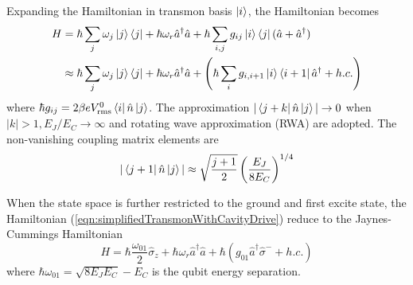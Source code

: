 \documentclass[%
groupedaddress,
showpacs,
 amsmath,amssymb,
 aps,
prb,
]{revtex4-1}
\begin{document}
            Expanding the Hamiltonian in transmon basis $ \ket{i} $, the Hamiltonian becomes
            \begin{align}
            \label{eqn:transmonWithCavityDriveExpanded}
                H &= \hbar \sum_j \omega_j \ket j \bra j + \hbar \omega_r \hat a^\dagger \hat a + \hbar \sum_{i,j} g_{ij} \ket i \bra j (\hat a + \hat a^\dagger ) \\
                \label{eqn:simplifiedTransmonWithCavityDrive}
                & \approx \hbar \sum_j \omega_j \ket j \bra j + \hbar \omega_r \hat a^\dagger \hat a  + \left (\hbar \sum_{i} g_{i,i+1} \ket i \bra{i+1} \hat a^\dagger + h.c. \right )
            \end{align}
            where $\hbar g_{ij} = 2 \beta e V^0_{\text{rms}} \bra i \hat n \ket j$. The approximation $ |\bra{j+k}\hat n \ket j| \rightarrow 0  $ when $|k|>1, E_J/E_C \rightarrow \infty $ and rotating wave approximation (RWA) are adopted. The non-vanishing coupling matrix elements are
            \begin{equation}
            \label{eqn:couplingElements}
                | \bra{j+1} \hat n \ket j |\approx \sqrt{ \frac{j+1}{2}} \left ( \frac{E_J}{8E_C} \right )^{1/4} 
            \end{equation}

            When the state space is further restricted to the ground and first excite state, the Hamiltonian (\ref{eqn:simplifiedTransmonWithCavityDrive}) reduce to the Jaynes-Cummings Hamiltonian\cite{walls2007quantum,schuster2007circuit}
            \begin{equation}
            \label{eqn:JCHamiltonian}
                H = \hbar \frac{\omega_{01}}{2} \hat \sigma_z + \hbar \omega_r \hat a^\dagger \hat a  + \hbar (g_{01}\hat a^\dagger \hat \sigma^- + h.c. )
            \end{equation}
            where $ \hbar \omega_{01} = \sqrt{8E_JE_C} - E_C $ is the qubit energy separation.
            
\end{document}
